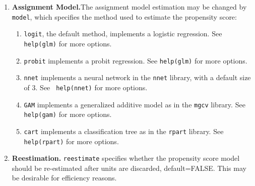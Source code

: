 \documentclass[oneside,letterpaper,titlepage]{article}
\begin{document}
\begin{enumerate}
\item \textbf{Assignment Model.}The assignment model estimation may be
  changed by \texttt{model}, which specifies the method used to estimate the propensity score:
  \begin{enumerate}
  \item \texttt{logit}, the default method, implements a logistic regression.  See
    {\tt help(glm)} for more options. 
  \item \texttt{probit} implements a probit regression.  See
    {\tt help(glm)} for more options. 
  \item \texttt{nnet} implements a neural network in the
    \texttt{nnet} library, with a default size of 3.  See {\tt
      help(nnet)} for more options.
  \item \texttt{GAM} implements a generalized additive model 
    as in the \texttt{mgcv} library.  See
    {\tt help(gam)} for more options.
  \item \texttt{cart} implements a classification tree as in the
    \texttt{rpart} library.  See {\tt help(rpart)} for more
    options.  
  \end{enumerate}

\item \textbf{Reestimation.} \texttt{reestimate} specifies whether the
  propensity score model should be re-estimated after units are
  discarded, default=FALSE.  This may be desirable for efficiency
  reasons. 
  

\end{enumerate}
\end{document}
